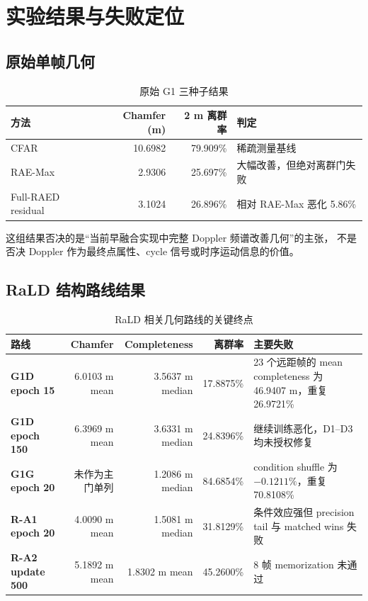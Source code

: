 \documentclass[11pt,a4paper,fontset=none]{ctexart}
\begin{document}
\section{实验结果与失败定位}

\subsection{原始单帧几何}

\begin{table}[H]
\centering
\caption{原始 G1 三种子结果}
\begin{tabular}{lrrl}
\toprule
方法 & Chamfer (m) & 2 m 离群率 & 判定 \\
\midrule
CFAR & 10.6982 & 79.909\% & 稀疏测量基线 \\
RAE-Max & 2.9306 & 25.697\% & 大幅改善，但绝对离群门失败 \\
Full-RAED residual & 3.1024 & 26.896\% & 相对 RAE-Max 恶化 5.86\% \\
\bottomrule
\end{tabular}
\end{table}

这组结果否决的是“当前早融合实现中完整 Doppler 频谱改善几何”的主张，
不是否决 Doppler 作为最终点属性、cycle 信号或时序运动信息的价值。

\subsection{RaLD 结构路线结果}

\begin{table}[H]
\centering
\small
\caption{RaLD 相关几何路线的关键终点}
\begin{tabularx}{\textwidth}{>{\bfseries}p{2.1cm} r r r Y}
\toprule
路线 & Chamfer & Completeness & 离群率 & 主要失败 \\
\midrule
G1D epoch 15 & 6.0103 m mean & 3.5637 m median & 17.8875\% & 23 个远距帧的 mean completeness 为 46.9407 m，重复 26.9721\% \\
G1D epoch 150 & 6.3969 m mean & 3.6331 m median & 24.8396\% & 继续训练恶化，D1--D3 均未授权修复 \\
G1G epoch 20 & 未作为主门单列 & 1.2086 m median & 84.6854\% & condition shuffle 为 $-0.1211\%$，重复 70.8108\% \\
R-A1 epoch 20 & 4.0090 m mean & 1.5081 m median & 31.8129\% & 条件效应强但 precision tail 与 matched wins 失败 \\
R-A2 update 500 & 5.1892 m mean & 1.8302 m mean & 45.2600\% & 8 帧 memorization 未通过 \\
\bottomrule
\end{tabularx}
\end{table}
\end{document}
